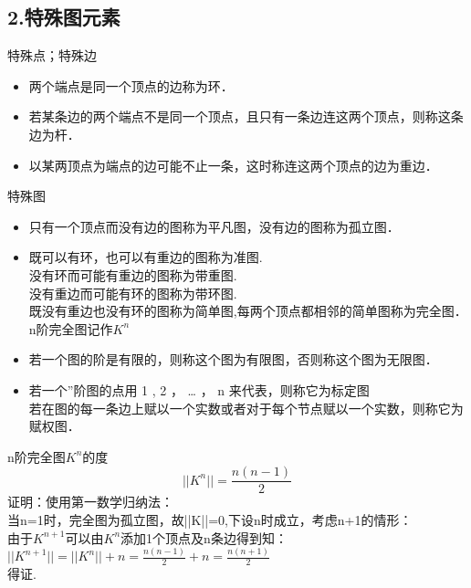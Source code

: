 \subsection{2.特殊图元素}
\begin{definition}{特殊点；特殊边}
\begin{itemize}
\item 两个端点是同一个顶点的边称为环．
\item 若某条边的两个端点不是同一个顶点，且只有一条边连这两个顶点，则称这条边为杆．
\item 以某两顶点为端点的边可能不止一条，这时称连这两个顶点的边为重边．
\end{itemize}
\end{definition}
\begin{definition}{特殊图}
\begin{itemize}
\item 只有一个顶点而没有边的图称为平凡图，没有边的图称为孤立图．
\item 既可以有环，也可以有重边的图称为准图.
\\没有环而可能有重边的图称为带重图.
\\没有重边而可能有环的图称为带环图.
\\既没有重边也没有环的图称为简单图,每两个顶点都相邻的简单图称为完全图．n阶完全图记作$K^{n}$
\item 若一个图的阶是有限的，则称这个图为有限图，否则称这个图为无限图．
\item 若一个”阶图的点用 1 , 2 ， … ， n 来代表，则称它为标定图
\\若在图的每一条边上赋以一个实数或者对于每个节点赋以一个实数，则称它为赋权图．
\end{itemize}
\end{definition}
\begin{theorem}{n阶完全图$K^{n}$的度}
\begin{equation}
||K^{n}||=\frac{n(n-1)}{2}
\end{equation}
证明：使用第一数学归纳法：
\\当n=1时，完全图为孤立图，故||K||=0,下设n时成立，考虑n+1的情形：
\\由于$K^{n+1}$可以由$K^{n}$添加1个顶点及n条边得到知：
\\ $||K^{n+1}||=||K^{n}||+n=\frac{n(n-1)}{2}+n=\frac{n(n+1)}{2}$
\\得证.
\end{theorem}
